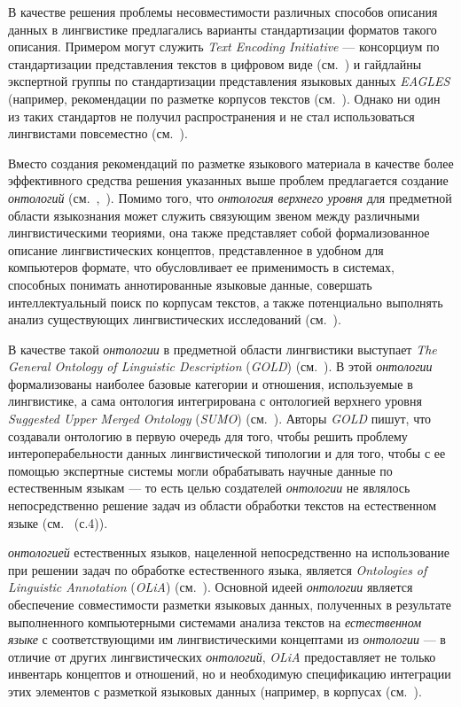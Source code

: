 В качестве решения проблемы несовместимости различных способов описания данных в лингвистике предлагались варианты стандартизации форматов такого описания.
Примером могут служить \textit{Text Encoding Initiative} --- консорциум по стандартизации представления текстов в цифровом виде (см.~) и гайдлайны экспертной группы по стандартизации представления языковых данных \textit{EAGLES} (например, рекомендации по разметке корпусов текстов (см.~).
Однако ни один из таких стандартов не получил распространения и не стал использоваться лингвистами повсеместно (см.~).

Вместо создания рекомендаций по разметке языкового материала в качестве более эффективного средства решения указанных выше проблем предлагается создание \textit{онтологий} (см.~,~).
Помимо того, что \textit{онтология верхнего уровня} для предметной области языкознания может служить связующим звеном между различными лингвистическими теориями, она также представляет собой формализованное описание лингвистических концептов, представленное в удобном для компьютеров формате, что обусловливает ее применимость в системах, способных понимать аннотированные языковые данные, совершать интеллектуальный поиск по корпусам текстов, а также потенциально выполнять анализ существующих лингвистических исследований (см.~).

В качестве такой \textit{онтологии} в предметной области лингвистики выступает \textit{The General Ontology of Linguistic Description} (\textit{GOLD}) (см.~).
В этой \textit{онтологии} формализованы наиболее базовые категории и отношения, используемые в лингвистике, а сама онтология интегрирована с онтологией верхнего уровня \textit{Suggested Upper Merged Ontology} (\textit{SUMO}) (см.~).
Авторы \textit{GOLD} пишут, что создавали онтологию в первую очередь для того, чтобы решить проблему интероперабельности данных лингвистической типологии и для того, чтобы с ее помощью экспертные системы могли обрабатывать научные данные по естественным языкам --- то есть целью создателей \textit{онтологии} не являлось непосредственно решение задач из области обработки текстов на естественном языке (см.~ (с.4)).

\textit{онтологией} естественных языков, нацеленной непосредственно на использование при решении задач по обработке естественного языка, является \textit{Ontologies of Linguistic Annotation} (\textit{OLiA}) (см.~).
Основной идеей \textit{онтологии} является обеспечение совместимости разметки языковых данных, полученных в результате выполненного компьютерными системами анализа текстов на \textit{естественном языке} с соответствующими им лингвистическими концептами из \textit{онтологии} --- в отличие от других лингвистических \textit{онтологий}, \textit{OLiA} предоставляет не только инвентарь концептов и отношений, но и необходимую спецификацию интеграции этих элементов с разметкой языковых данных (например, в корпусах (см.~).

